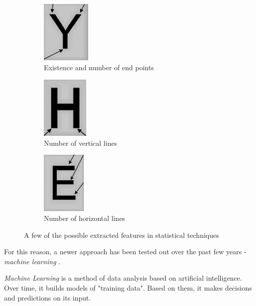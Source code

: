 \begin{figure}[H]
\hspace*{\fill} %
\begin{subfigure}{0.30\textwidth}
\includegraphics[width=\linewidth,height=30mm]{img/statis_endPoint.jpg}
\caption{Existence and number of end points} \label{fig:1b}
\end{subfigure}
\hspace*{\fill} %
\begin{subfigure}{0.30\textwidth}
\includegraphics[width=\linewidth,height=30mm]{img/statis_vertical.jpg}
\caption{Number of vertical lines} \label{fig:1c}
\end{subfigure}
\begin{subfigure}{0.30\textwidth}
\includegraphics[width=\linewidth,height=30mm]{img/statis_horizontal.jpg}
\caption{Number of horizontal lines} \label{fig:1c}
\end{subfigure}
\caption{A few of the possible extracted features in statistical techniques \citep{vithlani2015structural}} \label{fig:1}
\end{figure}

For this reason, a newer approach has been tested out over the past few years - \emph{machine learning} \citep{characterClassification}.

\emph{Machine Learning} \citep{sebastiani2002machine} is a method of data analysis based on artificial intelligence. Over time, it builds models of "training data". Based on them, it makes decisions and predictions on its input. 

